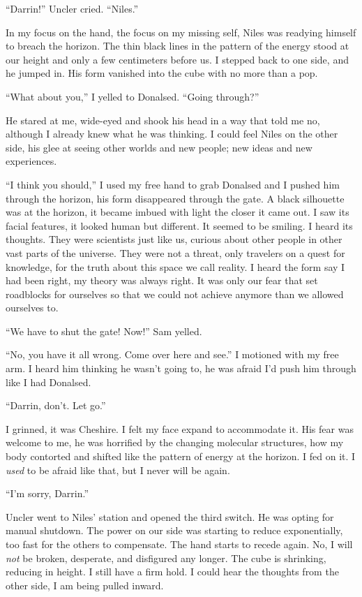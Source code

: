 ``Darrin!'' Uncler cried. ``Niles.''

In my focus on the hand, the focus on my missing self, Niles was
readying himself to breach the horizon. The thin black lines in the
pattern of the energy stood at our height and only a few centimeters
before us. I stepped back to one side, and he jumped in. His form
vanished into the cube with no more than a pop.

``What about you,'' I yelled to Donalsed. ``Going through?''

He stared at me, wide-eyed and shook his head in a way that told me no,
although I already knew what he was thinking. I could feel Niles on the
other side, his glee at seeing other worlds and new people; new ideas
and new experiences.

``I think you should,'' I used my free hand to grab Donalsed and I
pushed him through the horizon, his form disappeared through the gate. A
black silhouette was at the horizon, it became imbued with light the
closer it came out. I saw its facial features, it looked human but
different. It seemed to be smiling. I heard its thoughts. They were
scientists just like us, curious about other people in other vast parts
of the universe. They were not a threat, only travelers on a quest for
knowledge, for the truth about this space we call reality. I heard the
form say I had been right, my theory was always right. It was only our
fear that set roadblocks for ourselves so that we could not achieve
anymore than we allowed ourselves to.

``We have to shut the gate! Now!'' Sam yelled.

``No, you have it all wrong. Come over here and see.'' I motioned with
my free arm. I heard him thinking he wasn't going to, he was afraid I'd
push him through like I had Donalsed.

``Darrin, don't. Let go.''

I grinned, it was Cheshire. I felt my face expand to accommodate it. His
fear was welcome to me, he was horrified by the changing molecular
structures, how my body contorted and shifted like the pattern of energy
at the horizon. I fed on it. I \emph{used} to be afraid like that, but I
never will be again.

``I'm sorry, Darrin.''

Uncler went to Niles' station and opened the third switch. He was opting
for manual shutdown. The power on our side was starting to reduce
exponentially, too fast for the others to compensate. The hand starts to
recede again. No, I will \emph{not} be broken, desperate, and disfigured
any longer. The cube is shrinking, reducing in height. I still have a
firm hold. I could hear the thoughts from the other side, I am being
pulled inward.

